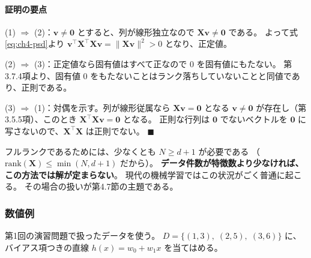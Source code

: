 \paragraph{証明の要点}
(1) $\Rightarrow$ (2)：$\bm{v} \neq \bm{0}$ とすると、列が線形独立なので $\bm{X}\bm{v} \neq \bm{0}$ である。
よって式\eqref{eq:ch4-psd}より $\bm{v}^\top\bm{X}^\top\bm{X}\bm{v} = \|\bm{X}\bm{v}\|^2 > 0$ となり、正定値。

(2) $\Rightarrow$ (3)：正定値なら固有値はすべて正なので $0$ を固有値にもたない。
第3.7.4項より、固有値 $0$ をもたないことはランク落ちしていないことと同値であり、正則である。

(3) $\Rightarrow$ (1)：対偶を示す。列が線形従属なら $\bm{X}\bm{v} = \bm{0}$ となる
$\bm{v} \neq \bm{0}$ が存在し（第3.5.5項）、このとき $\bm{X}^\top\bm{X}\bm{v} = \bm{0}$ となる。
正則な行列は $\bm{0}$ でないベクトルを $\bm{0}$ に写さないので、$\bm{X}^\top\bm{X}$ は正則でない。
\hfill $\blacksquare$

フルランクであるためには、少なくとも $N \geq d+1$ が必要である
（$\mathrm{rank}(\bm{X}) \leq \min(N, d+1)$ だから）。
\textbf{データ件数が特徴数より少なければ、この方法では解が定まらない}。
現代の機械学習ではこの状況がごく普通に起こる。
その場合の扱いが第4.7節の主題である。

\subsubsection{数値例}

第1回の演習問題で扱ったデータを使う。
$D = \{(1, 3),\; (2, 5),\; (3, 6)\}$ に、
バイアス項つきの直線 $h(x) = w_0 + w_1 x$ を当てはめる。

